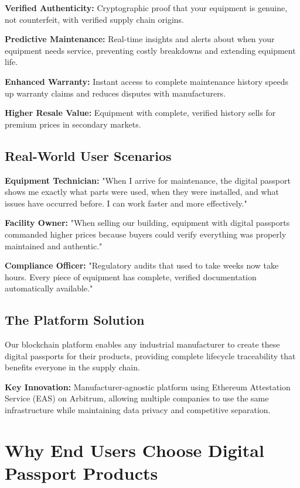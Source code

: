 \documentclass[11pt,a4paper]{article}
\begin{document}
\textbf{Verified Authenticity:} Cryptographic proof that your equipment is genuine, not counterfeit, with verified supply chain origins.

\textbf{Predictive Maintenance:} Real-time insights and alerts about when your equipment needs service, preventing costly breakdowns and extending equipment life.

\textbf{Enhanced Warranty:} Instant access to complete maintenance history speeds up warranty claims and reduces disputes with manufacturers.

\textbf{Higher Resale Value:} Equipment with complete, verified history sells for premium prices in secondary markets.

\subsection{Real-World User Scenarios}

\textbf{Equipment Technician:}
"When I arrive for maintenance, the digital passport shows me exactly what parts were used, when they were installed, and what issues have occurred before. I can work faster and more effectively."

\textbf{Facility Owner:}
"When selling our building, equipment with digital passports commanded higher prices because buyers could verify everything was properly maintained and authentic."

\textbf{Compliance Officer:}
"Regulatory audits that used to take weeks now take hours. Every piece of equipment has complete, verified documentation automatically available."

\subsection{The Platform Solution}

Our blockchain platform enables any industrial manufacturer to create these digital passports for their products, providing complete lifecycle traceability that benefits everyone in the supply chain.

\textbf{Key Innovation:} Manufacturer-agnostic platform using Ethereum Attestation Service (EAS) on Arbitrum, allowing multiple companies to use the same infrastructure while maintaining data privacy and competitive separation.

\section{Why End Users Choose Digital Passport Products}
\end{document}

